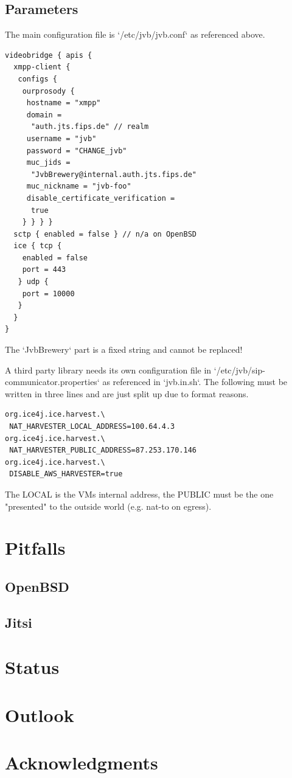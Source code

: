 \documentclass[conference]{IEEEtran}
\begin{document}
\subsection{Parameters}
The main configuration file is `/etc/jvb/jvb.conf` as referenced above.
\begin{verbatim}
videobridge { apis {
  xmpp-client {
   configs {
    ourprosody {
     hostname = "xmpp"
     domain = 
      "auth.jts.fips.de" // realm
     username = "jvb"
     password = "CHANGE_jvb"
     muc_jids = 
      "JvbBrewery@internal.auth.jts.fips.de"
     muc_nickname = "jvb-foo"
     disable_certificate_verification =
      true 
    } } } }
  sctp { enabled = false } // n/a on OpenBSD
  ice { tcp {
    enabled = false
    port = 443
   } udp {
    port = 10000
   }
  }
}
\end{verbatim}
The `JvbBrewery` part is a fixed string and cannot be replaced!

A third party library needs its own configuration file in `/etc/jvb/sip-communicator.properties`
as referenced in `jvb.in.sh`. The following must be written in three lines and are just
split up due to format reasons.
\begin{verbatim}
org.ice4j.ice.harvest.\
 NAT_HARVESTER_LOCAL_ADDRESS=100.64.4.3
org.ice4j.ice.harvest.\
 NAT_HARVESTER_PUBLIC_ADDRESS=87.253.170.146
org.ice4j.ice.harvest.\
 DISABLE_AWS_HARVESTER=true
\end{verbatim}
The LOCAL is the VMs internal address, the PUBLIC must be the one "presented" to the
outside world (e.g. nat-to on egress).

\section{Pitfalls}
\subsection{OpenBSD}
\subsection{Jitsi}
\section{Status}
\section{Outlook}
\section{Acknowledgments}
\end{document}
